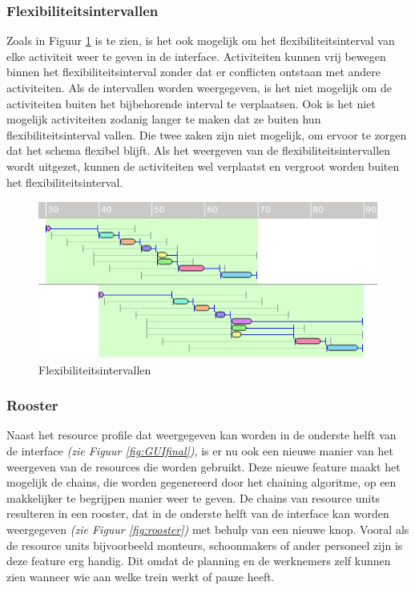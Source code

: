\subsubsection*{Flexibiliteitsintervallen}
Zoals in Figuur \ref{fig:flex-interval} is te zien, is het ook mogelijk om het flexibiliteitsinterval van elke activiteit weer te geven in de interface. Activiteiten kunnen vrij bewegen binnen het flexibiliteitsinterval zonder dat er conflicten ontstaan met andere activiteiten. Als de intervallen worden weergegeven, is het niet mogelijk om de activiteiten buiten het bijbehorende interval te verplaatsen. Ook is het niet mogelijk activiteiten zodanig langer te maken dat ze buiten hun flexibiliteitsinterval vallen. Die twee zaken zijn niet mogelijk, om ervoor te zorgen dat het schema flexibel blijft. Als het weergeven van de flexibiliteitsintervallen wordt uitgezet, kunnen de activiteiten wel verplaatst en vergroot worden buiten het flexibiliteitsinterval.

\begin{figure}[H]
\center
\includegraphics[width=.7\textwidth]{../images/flex-interval.png}
\caption{Flexibiliteitsintervallen}
\label{fig:flex-interval}
\end{figure}

\subsubsection*{Rooster}
Naast het resource profile dat weergegeven kan worden in de onderste helft van de interface \emph{(zie Figuur \ref{fig:GUIfinal})}, is er nu ook een nieuwe manier van het weergeven van de resources die worden gebruikt. Deze nieuwe feature maakt het mogelijk de chains, die worden gegenereerd door het chaining algoritme, op een makkelijker te begrijpen manier weer te geven. De chains van resource units resulteren in een rooster, dat in de onderste helft van de interface kan worden weergegeven \emph{(zie Figuur \ref{fig:rooster})} met behulp van een nieuwe knop. Vooral als de resource units bijvoorbeeld monteurs, schoonmakers of ander personeel zijn is deze feature erg handig. Dit omdat de planning en de werknemers zelf kunnen zien wanneer wie aan welke trein werkt of pauze heeft. 

